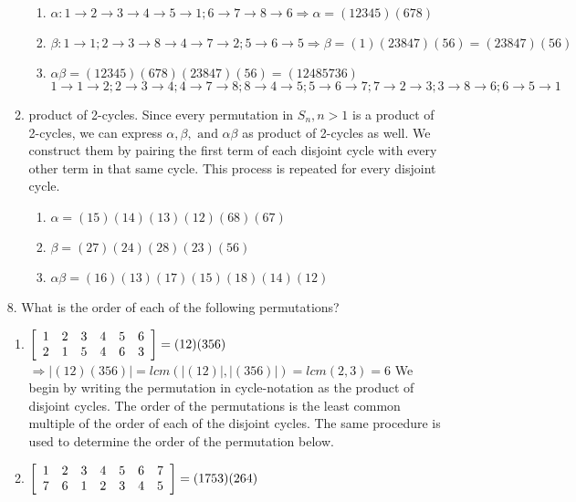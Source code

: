 \documentclass{article}
\begin{document}
\begin{enumerate}
\begin{enumerate}
    \begin{enumerate}
        \item $\alpha: 1\rightarrow2\rightarrow3\rightarrow4\rightarrow5\rightarrow1; 6\rightarrow7\rightarrow8\rightarrow6 \Rightarrow \alpha = (12345)(678)$
        \item $\beta: 1\rightarrow1;2\rightarrow3\rightarrow8\rightarrow4\rightarrow7\rightarrow2;5\rightarrow6\rightarrow5 \Rightarrow \beta = (1)(23847)(56) = (23847)(56)$
        \item $\alpha\beta = (12345)(678)(23847)(56) = (12485736)$
        $$1\rightarrow1\rightarrow2;2\rightarrow3\rightarrow4;4\rightarrow7\rightarrow8;8\rightarrow4\rightarrow5;5\rightarrow6\rightarrow7;7\rightarrow2\rightarrow3;3\rightarrow8\rightarrow6;6\rightarrow5\rightarrow1$$
    \end{enumerate}
    \item product of 2-cycles.\newline
    Since every permutation in $S_n, n > 1$ is a product of 2-cycles, we can express $\alpha, \beta, \text{ and } \alpha\beta$ as product of 2-cycles as well. We construct them by pairing the first term of each disjoint cycle with every other term in that same cycle. This process is repeated for every disjoint cycle.
    \begin{enumerate}
        \item $\alpha = (15)(14)(13)(12)(68)(67)$
        \item $\beta = (27)(24)(28)(23)(56)$
        \item $\alpha\beta = (16)(13)(17)(15)(18)(14)(12)$
    \end{enumerate}
\end{enumerate}
\item[8.] What is the order of each of the following permutations?
\begin{enumerate}
    \item $\left[ \begin{array} { l l l l l l } { 1 } & { 2 } & { 3 } & { 4 } & { 5 } & { 6 } \\ { 2 } & { 1 } & { 5 } & { 4 } & { 6 } & { 3 } \end{array} \right] = (12)(356)$\newline
    $\Rightarrow \lvert(12)(356)\rvert = lcm(\lvert(12)\rvert,\lvert(356)\rvert) = lcm(2,3) = 6$\newline
    We begin by writing the permutation in cycle-notation as the product of disjoint cycles. The order of the permutations is the least common multiple of the order of each of the disjoint cycles. The same procedure is used to determine the order of the permutation below.
    \item $\left[ \begin{array} { l l l l l l l } { 1 } & { 2 } & { 3 } & { 4 } & { 5 } & { 6 } & { 7 } \\ { 7 } & { 6 } & { 1 } & { 2 } & { 3 } & { 4 } & { 5 } \end{array} \right] = (1753)(264)$\newline
    

\end{enumerate}
\end{enumerate}
\end{document}
